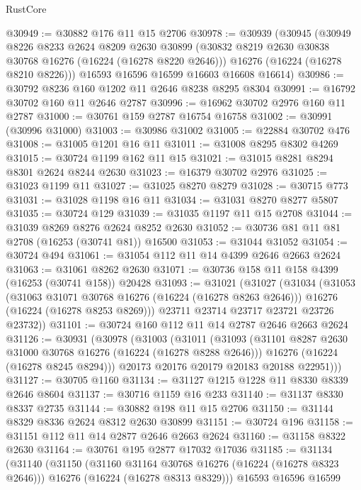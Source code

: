 \begin{lexlean}{RustCore}
\begin{coremodule}
@30949 := @30882 @176 @11 @15 @2706
@30978 := @30939
    (@30945
      (@30949
        @8226
        @8233
        @2624
        @8209
        @2630
        @30899
        (@30832 @8219 @2630 @30838 @30768 @16276 (@16224 (@16278 @8220 @2646)))
        @16276
        (@16224 (@16278 @8210 @8226)))
      @16593
      @16596
      @16599
      @16603
      @16608
      @16614)
@30986 := @30792 @8236 @160 @1202 @11 @2646 @8238 @8295 @8304
@30991 := @16792 @30702 @160 @11 @2646 @2787
@30996 := @16962 @30702 @2976 @160 @11 @2787
@31000 := @30761 @159 @2787 @16754 @16758
@31002 := @30991 (@30996 @31000)
@31003 := @30986 @31002
@31005 := @22884 @30702 @476
@31008 := @31005 @1201 @16 @11
@31011 := @31008 @8295 @8302 @4269
@31015 := @30724 @1199 @162 @11 @15
@31021 := @31015 @8281 @8294 @8301 @2624 @8244 @2630
@31023 := @16379 @30702 @2976
@31025 := @31023 @1199 @11
@31027 := @31025 @8270 @8279
@31028 := @30715 @773
@31031 := @31028 @1198 @16 @11
@31034 := @31031 @8270 @8277 @5807
@31035 := @30724 @129
@31039 := @31035 @1197 @11 @15 @2708
@31044 := @31039 @8269 @8276 @2624 @8252 @2630
@31052 := @30736 @81 @11 @81 @2708 (@16253 (@30741 @81)) @16500
@31053 := @31044 @31052
@31054 := @30724 @494
@31061 := @31054 @112 @11 @14 @4399 @2646 @2663 @2624
@31063 := @31061 @8262 @2630
@31071 := @30736 @158 @11 @158 @4399 (@16253 (@30741 @158)) @20428
@31093 := @31021
    (@31027
      (@31034
        (@31053
          (@31063 @31071 @30768 @16276 (@16224 (@16278 @8263 @2646)))
          @16276
          (@16224 (@16278 @8253 @8269)))
        @23711
        @23714
        @23717
        @23721
        @23726
        @23732))
@31101 := @30724 @160 @112 @11 @14 @2787 @2646 @2663 @2624
@31126 := @30931
    (@30978
      (@31003
        (@31011
          (@31093
            (@31101 @8287 @2630 @31000 @30768 @16276 (@16224 (@16278 @8288 @2646)))
            @16276
            (@16224 (@16278 @8245 @8294)))
          @20173
          @20176
          @20179
          @20183
          @20188
          @22951)))
@31127 := @30705 @1160
@31134 := @31127 @1215 @1228 @11 @8330 @8339 @2646 @8604
@31137 := @30716 @1159 @16 @233
@31140 := @31137 @8330 @8337 @2735
@31144 := @30882 @198 @11 @15 @2706
@31150 := @31144 @8329 @8336 @2624 @8312 @2630 @30899
@31151 := @30724 @196
@31158 := @31151 @112 @11 @14 @2877 @2646 @2663 @2624
@31160 := @31158 @8322 @2630
@31164 := @30761 @195 @2877 @17032 @17036
@31185 := @31134
    (@31140
      (@31150
        (@31160 @31164 @30768 @16276 (@16224 (@16278 @8323 @2646)))
        @16276
        (@16224 (@16278 @8313 @8329)))
      @16593
      @16596
      @16599

\end{coremodule}
\end{lexlean}
